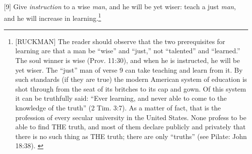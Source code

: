 [9] \textcolor[rgb]{0.00,0.00,1.00}{Give \emph{instruction} to a wise \emph{man}, and he will be yet wiser: teach a just \emph{man}, and he will increase in learning.}\footnote{[RUCKMAN] The reader should observe that the two prerequisites for learning are that a man be “wise” and “just,” not “talented” and “learned.” The soul winner is wise (Prov. 11:30), and when he is instructed, he will be yet wiser. The “just” man of verse 9 can take teaching and learn from it. By such standards (if they are true) the modern American system of education is shot through from the seat of its britches to its cap and gown. Of this system it can be truthfully said: “Ever learning, and never able to come to the knowledge of the truth” (2 Tim. 3:7). As a matter of fact, that is the profession of every secular university in the United States. None profess to be able to find THE truth, and most of them declare publicly and privately that there is no such thing as THE truth; there are only “truths” (see Pilate: John 18:38). \cite{Ruckman1972Proverbs}}
